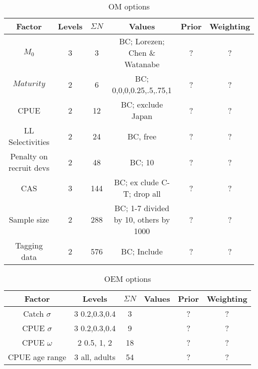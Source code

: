 \documentclass[a4paper,10pt]{article}
\begin{document}
\begin{table}
\begin{center}
\label{tab:datasumm}
\begin{tabular}{|cccccc|}
\hline
{\tiny Factor} & {\tiny Levels} & {\tiny $\Sigma N$} & {\tiny Values} & {\tiny Prior} & {\tiny Weighting}\\
\hline\hline
{\tiny $M_0$} 			& {\tiny 3}   & {\tiny 3}  	& {\tiny  BC; Lorezen; Chen \& Watanabe} 	          	& {\tiny ?}  	& {\tiny ?}\\
{\tiny $Maturity$} 		& {\tiny 2}   & {\tiny 6}  	& {\tiny  BC; 0,0,0,0.25,.5,.75,1}  				& {\tiny ?}  	& {\tiny ?}\\
{\tiny CPUE} 			& {\tiny 2}   & {\tiny 12} 	& {\tiny  BC; exclude Japan}     	         		& {\tiny ?}  	& {\tiny ?}\\
{\tiny LL Selectivities}	& {\tiny 2}   & {\tiny 24} 	& {\tiny  BC, free}		                               	& {\tiny ?}  	& {\tiny ?}\\
{\tiny Penalty on recruit devs}	& {\tiny 2}   & {\tiny 48} 	& {\tiny  BC; 10}		                              	& {\tiny ?}  	& {\tiny ?}\\
{\tiny CAS} 			& {\tiny 3}   & {\tiny 144} 	& {\tiny  BC; ex	clude C-T; drop all}		              	& {\tiny ?}  	& {\tiny ?}\\
{\tiny Sample size} 		& {\tiny 2}   & {\tiny 288} 	& {\tiny  BC; 1-7 divided by 10, others by 1000}  		& {\tiny ?}  	& {\tiny ?}\\
{\tiny Tagging data} 		& {\tiny 2}   & {\tiny 576} 	& {\tiny  BC; Include}                           		& {\tiny ?}  	& {\tiny ?}\\
\hline
\end{tabular}
\end{center}
\caption{OM options}
\label{tab:om}
\end{table}

\begin{table}
\begin{center}
\label{tab:datasumm}
\begin{tabular}{|cccccc|}
\hline
{\tiny Factor} & {\tiny Levels} & {\tiny $\Sigma N$} & {\tiny Values} & {\tiny Prior} & {\tiny Weighting}\\
\hline\hline
{\tiny  Catch $\sigma$}		& {\tiny 3}  {\tiny 0.2,0.3,0.4	}	& {\tiny  3}  	& {\tiny  }  	& {\tiny ?}  	& {\tiny ?}\\
{\tiny  CPUE  $\sigma$} 	& {\tiny 3}  {\tiny 0.2,0.3,0.4}	& {\tiny  9} 	& {\tiny  } 	& {\tiny ?}  	& {\tiny ?}\\
{\tiny  CPUE  $\omega$} 	& {\tiny 2}  {\tiny 0.5, 1, 2} 		& {\tiny  18} 	& {\tiny  } 	& {\tiny ?}  	& {\tiny ?}\\
{\tiny  CPUE  age range} 	& {\tiny 3}  {\tiny all, adults} 	& {\tiny  54} 	& {\tiny  } 	& {\tiny ?}  	& {\tiny ?}\\
\hline
\end{tabular}
\end{center}
\caption{OEM options}
\label{tab:oem}
\end{table}
\end{document}

